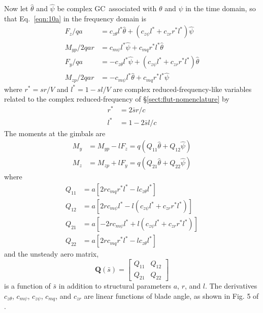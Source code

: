 \documentclass[10pt,openany,twoside]{book}
\numberwithin{equation}{section}   %
\newcommand{\Matrix}[1]{\boldsymbol{#1}}
\newcommand{\Gc}{GC}
\newcommand{\Sectref}[1]{\S\ref{#1}}
\newcommand{\Eqn}[1]{Eq.\ \ref{#1}}
\begin{document}
Now let $\hat{\theta}$ and $\hat{\psi}$ be complex \Gc\ associated with
$\theta$ and $\psi$ in the time domain, so that \Eqn{eqn:10a} in the frequency
domain is
\begin{align*}
\label{eqn:10b}
F_z/qa &= c_{z\theta}l^*\hat{\theta} + \left( c_{z\psi}l^* + c_{zr}r^*l^*\right)\hat{\psi} \nonumber \\
M_{yp}/2qar &= c_{m\psi}l^*\hat{\psi} + c_{mq}r^*l^*\hat{\theta} \nonumber \\
F_y/qa &= -c_{z\theta}l^*\hat{\psi} + \left(c_{z\psi}l^* + c_{zr}r^*l^*\right)\hat{\theta} \nonumber \\
M_{zp}/2qar &= -c_{m\psi}l^*\hat{\theta} + c_{mq}r^*l^*\hat{\psi}
\end{align*}
where $r^* = sr/V$ and $l^* = 1 - sl/V$ are complex reduced-frequency-like
variables related to the complex reduced-frequency of
\Sectref{sect:flut-nomenclature} by
\begin{align}
r^* &= 2\bar{s}r/c \nonumber \\
l^* &= 1 - 2\bar{s}l/c
\end{align}
The moments at the gimbals are
\begin{align}
M_y &= M_{yp} - lF_z = q(Q_{11}\hat{\theta} + Q_{12}\hat{\psi}) \nonumber \\
M_z &= M_{zp} + lF_y = q(Q_{21}\hat{\theta} + Q_{22}\hat{\psi})	\nonumber
\end{align}
where
\begin{align}
	Q_{11} &= a\left[2rc_{mq}r^*l^* - lc_{z\theta}l^*\right] \nonumber \\
	Q_{12} &= a\left[2rc_{m\psi}l^* - l\left(c_{z\psi}l^* + c_{zr}r^*l^*\right)\right] \nonumber \\
	Q_{21} &= a\left[-2rc_{m\psi}l^* + l\left(c_{z\psi}l^* + c_{zr}r^*l^*\right)\right] \nonumber \\
	Q_{22} &= a\left[2rc_{mq}r^*l^* - lc_{z\theta}l^*\right]	\nonumber
\end{align}
and the unsteady aero matrix,
\begin{equation}
\Matrix{Q}(\bar{s}) = \left[ \begin{array}{cc}
		Q_{11}  &  Q_{12} \\
		Q_{21}  &  Q_{22}
	\end{array} \right]	\nonumber
\end{equation}
is a function of $\bar{s}$ in addition to structural parameters $a$, $r$, and $l$.
The derivatives $c_{z\theta}$, $c_{m\psi}$, $c_{z\psi}$, $c_{mq}$, and $c_{zr}$
are linear functions of blade angle, as shown in Fig. 5 of \cite{reed1961analytical}.
\end{document}
